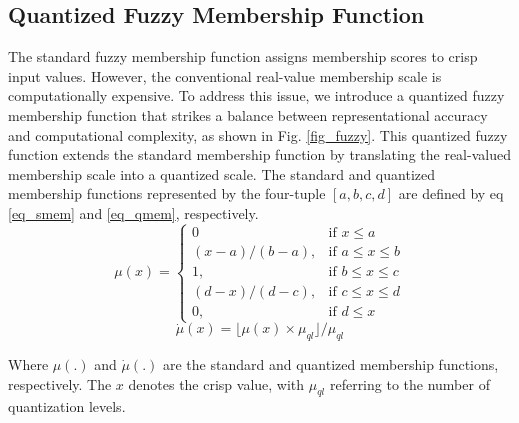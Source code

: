 \subsection{Quantized Fuzzy Membership Function}
\noindent
The standard fuzzy membership function assigns membership scores to crisp input values. However, the conventional real-value membership scale is computationally expensive. To address this issue, we introduce a quantized fuzzy membership function that strikes a balance between representational accuracy and computational complexity, as shown in Fig. \ref{fig_fuzzy}. This quantized fuzzy function extends the standard membership function by translating the real-valued membership scale into a quantized scale. The standard and quantized membership functions represented by the four-tuple $\left[ a, b, c, d \right] $ are defined by eq \eqref{eq_smem} and \eqref{eq_qmem}, respectively.
\begin{equation}
	\label{eq_smem}
	\mu(x) = 	
	\begin{cases}
		0 & \text{if } x \leq a \\
		(x-a)/(b-a), & \text{if } a \leq x \leq b \\
		1, & \text{if } b \leq x \leq c \\
		(d-x)/(d-c), & \text{if } c \leq x \leq d \\
		0, & \text{if } d \leq x
	\end{cases}
\end{equation}
\begin{equation}
	\label{eq_qmem}
	\dot{\mu}(x) = \lfloor \mu(x) \times \mu_{ql} \rfloor /\mu_{ql}
\end{equation}

Where $\mu(.)$ and $\dot{\mu}(.)$ are the standard and quantized membership functions, respectively. The $x$ denotes the crisp value, with $\mu_{ql}$ referring to the number of quantization levels. 



